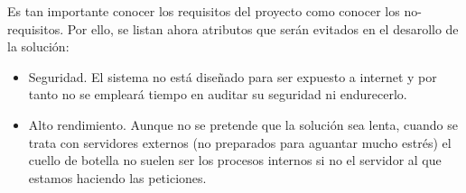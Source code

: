 Es tan importante conocer los requisitos del proyecto como conocer los no-requisitos. Por ello, se listan ahora atributos que serán evitados en el desarollo de la solución:

\begin{itemize}
    \item Seguridad. El sistema no está diseñado para ser expuesto a internet y por tanto no se empleará tiempo en auditar su seguridad ni endurecerlo.
    \item Alto rendimiento. Aunque no se pretende que la solución sea lenta, cuando se trata con servidores externos (no preparados para aguantar mucho estrés) el cuello de botella no suelen ser los procesos internos si no el servidor al que estamos haciendo las peticiones.
\end{itemize}